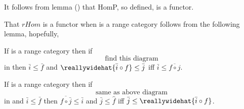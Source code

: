 \begin{oldtt}
It follows from lemma   () that HomP, so defined, is a functor.
\end{oldtt}

That $rHom$ is a functor when \catcw is a range category follows from the following lemma, hopefully,
\begin{lemma}[lemma A]
If \catcw is a range category then if
\[ \mbox{find this diagram}
\]
in \catcw
then
$\bar{i} \leq \bar{f}$
and 
$\reallywidehat{\bar{i}\circ f} \leq \bar{j}$
iff 
$\bar{i} \leq \overline{f \circ j}$.
\end{lemma}

\begin{lemma}[lemma B]
If \catcw is a range category then if
\[ \mbox{same as above diagram}
\]
in \catcw
and $\bar{i} \leq \bar{f}$ 
then
$\overline{f \circ \bar{j}} \leq \bar{i}$
and $\bar{j} \leq \hat{f}$
iff 
$\bar{j} \leq \reallywidehat{\bar{i} \circ  f }$.
\end{lemma}


